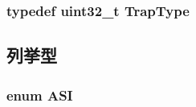 \label{namespaceSparcISA_a69329e1d929a534ff51be6cf8216b69a}
\hypertarget{namespaceSparcISA_aabeb6cc11127ef5b6ebc776bfc5fb95b}{
\subsubsection[{TrapType}]{\setlength{\rightskip}{0pt plus 5cm}typedef {\bf uint32\_\-t} {\bf TrapType}}}
\label{namespaceSparcISA_aabeb6cc11127ef5b6ebc776bfc5fb95b}


\subsection{列挙型}
\hypertarget{namespaceSparcISA_a6dd43f1311515252b283f56d7095a1f3}{
\subsubsection[{ASI}]{\setlength{\rightskip}{0pt plus 5cm}enum {\bf ASI}}}
\label{namespaceSparcISA_a6dd43f1311515252b283f56d7095a1f3}
